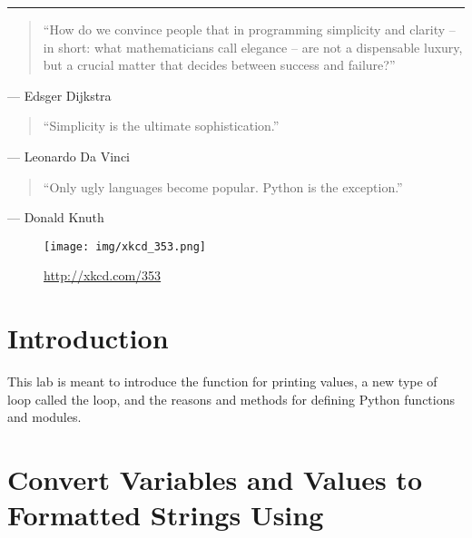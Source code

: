 \documentclass[11pt]{cselabheader}
\title{\thetitle}
\author{\theauthor}
\date{NMT Department of Computer Science and Engineering}
\begin{document}
\maketitle
\hrule

\begin{quotation}
  ``How do we convince people that in programming simplicity and clarity – in short:
  what mathematicians call elegance – are not a dispensable luxury, but a crucial matter
  that decides between success and failure?''
\end{quotation}
\begin{flushright}
--- Edsger Dijkstra
\end{flushright}

\begin{quotation}
  ``Simplicity is the ultimate sophistication.''
\end{quotation}
\begin{flushright}
--- Leonardo Da Vinci
\end{flushright}

\begin{quotation}
  ``Only ugly languages become popular. Python is the exception.''
\end{quotation}
\begin{flushright}
--- Donald Knuth
\end{flushright}

\vspace{1em}

\begin{figure}[H]
  \centering
  \texttt{[image: img/xkcd\_353.png]}
  \caption{\url{http://xkcd.com/353}}
\end{figure}

\newpage

\section*{Introduction}

This lab is meant to introduce the
 function for printing values, a
new type of loop called the  loop, and
the reasons and methods for defining Python functions and modules.

\tableofcontents

\newpage
{}
\section{\texorpdfstring%
  {Convert Variables and Values to Formatted Strings Using }
  {Convert Variables and Values to Formatted Strings Using "".format()}}
\end{document}
